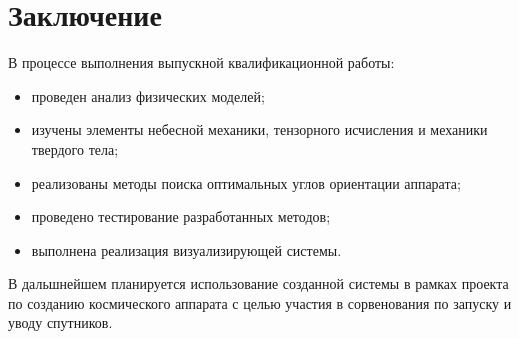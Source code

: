 \chapter{Заключение}
\noindent\indent В процессе выполнения выпускной квалификационной работы:
\begin{itemize}
    \item проведен анализ физических моделей;
    \item изучены элементы небесной механики, тензорного исчисления и механики
    твердого тела;
    \item реализованы методы поиска оптимальных углов ориентации аппарата;
    \item проведено тестирование разработанных методов;
    \item выполнена реализация визуализирующей системы.
\end{itemize}\par
    В дальшнейшем планируется использование созданной системы в рамках проекта
по созданию космического аппарата с целью участия в сорвенования по запуску и уводу
спутников.

